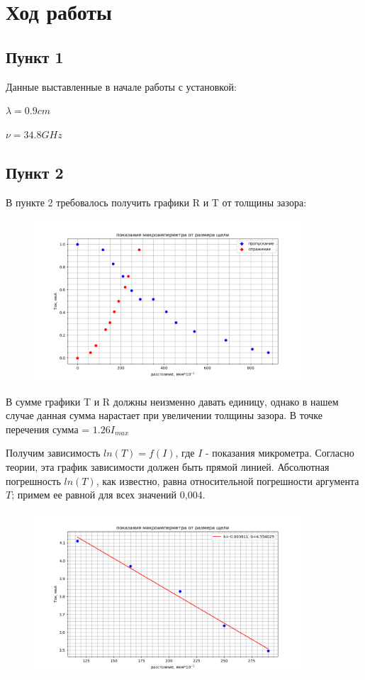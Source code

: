 \documentclass[a4paper, 12pt]{article}
\begin{document}
\newpage
\section{Ход работы}
\subsection{Пункт 1}
Данные выставленные в начале работы с установкой:

$\lambda = 0.9 cm$

$\nu = 34.8 GHz$

\subsection{Пункт 2}
В пункте 2 требовалось получить графики R и T от толщины зазора:
\begin{figure}[h!]
    \includegraphics[width=0.9\textwidth]{data/data1.png}
\end{figure}

В сумме графики T и R должны неизменно давать единицу, однако в нашем случае данная сумма нарастает при увеличении толщины зазора. В точке перечения сумма = $1.26 I_{max}$

Получим зависимость $ln(T) = f(I)$, где $I$ - показания микрометра. Согласно теории, эта
график зависимости должен быть прямой линией. Абсолютная погрешность $ln(T)$, как известно, равна относительной
погрешности аргумента $T$; примем ее равной для всех значений 0,004.
\newpage
\begin{figure}[h!]
    \includegraphics[width=0.9\textwidth]{data/data2.png}
\end{figure}
\end{document}
